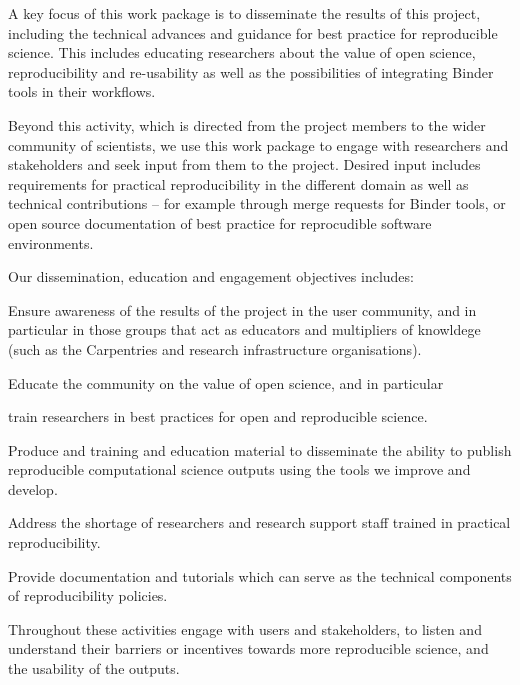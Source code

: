 \begin{workpackage}[id=education,wphases=0-36!1.14,
  title={Dissemination, education and engagement},
  short=Education,
  lead=IFR,
  IFRRM=16,
  MPRM=6,
  SRLRM=7,
  QSRM=3,
  UIORM=9,
  swsites
]


\begin{wpobjectives}
  A key focus of this work package is to disseminate the results of this
  project, including the technical advances and guidance for best practice for
  reproducible science. This includes educating researchers about the value of
  open science, reproducibility and re-usability as well as the possibilities of
  integrating Binder tools in their workflows.

  Beyond this activity, which is directed from the project members to the wider community of
  scientists, we use this work package to engage with researchers and
  stakeholders and seek input from them to the project. Desired input includes
  requirements for practical reproducibility in the different domain as well as 
  technical contributions -- for example through merge requests for Binder
  tools, or open source documentation of best practice for reprocudible software
  environments.

  Our dissemination, education and engagement objectives includes:
 \begin{compactitem}
   \item Ensure awareness of the results of the project in the user community,
     and in particular in those groups that act as educators and multipliers of
     knowldege (such as the Carpentries and research infrastructure organisations).
   \item Educate the community on the value of open science, and in particular
   \item train researchers in best practices for open and reproducible science.
   \item Produce and training and education material to disseminate the ability to
     publish reproducible computational science outputs using the tools we
     improve and develop.
   \item Address the shortage of researchers and research support staff trained
     in practical reproducibility.
   \item Provide documentation and tutorials which can serve as the technical
     components of reproducibility policies.
   \item Throughout these activities engage with users and stakeholders, to
     listen and understand their barriers or incentives towards more
     reproducible science, and the usability of the \TheProject outputs.
 \end{compactitem}
\end{wpobjectives}


\end{workpackage}

